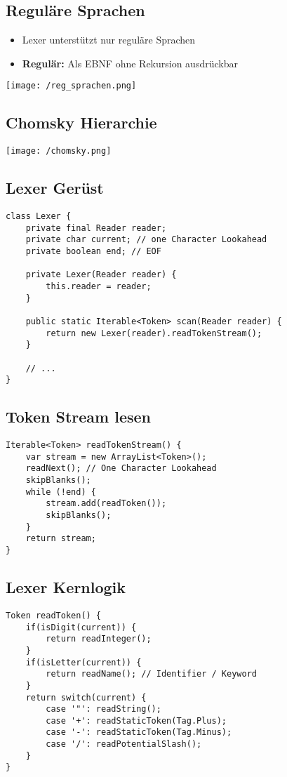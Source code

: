 \subsection{Reguläre Sprachen}
\begin{itemize}
    \item Lexer unterstützt nur reguläre Sprachen
    \item \textbf{Regulär:} Als EBNF ohne Rekursion ausdrückbar
\end{itemize}
\begin{center}
    \texttt{[image: /reg\_sprachen.png]} 
\end{center}

\subsection{Chomsky Hierarchie}
\begin{center}
    \texttt{[image: /chomsky.png]} 
\end{center}

\subsection{Lexer Gerüst}
\begin{lstlisting}
class Lexer {
    private final Reader reader;
    private char current; // one Character Lookahead
    private boolean end; // EOF 

    private Lexer(Reader reader) {
        this.reader = reader;
    }

    public static Iterable<Token> scan(Reader reader) {
        return new Lexer(reader).readTokenStream();
    }

    // ...
}
\end{lstlisting}

\subsection{Token Stream lesen}
\begin{lstlisting}
Iterable<Token> readTokenStream() {
    var stream = new ArrayList<Token>();
    readNext(); // One Character Lookahead
    skipBlanks();
    while (!end) {
        stream.add(readToken());
        skipBlanks();
    }
    return stream;
}
\end{lstlisting}

\subsection{Lexer Kernlogik}
\begin{lstlisting}
Token readToken() {
    if(isDigit(current)) {
        return readInteger();
    }
    if(isLetter(current)) {
        return readName(); // Identifier / Keyword 
    }
    return switch(current) {
        case '"': readString();
        case '+': readStaticToken(Tag.Plus);
        case '-': readStaticToken(Tag.Minus);
        case '/': readPotentialSlash();
    }
}
\end{lstlisting}

